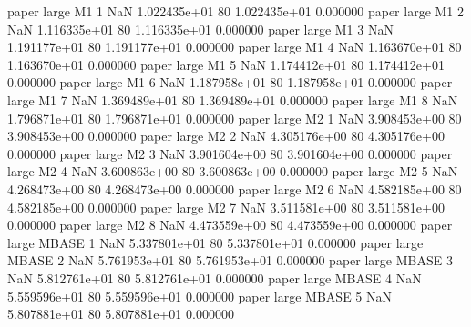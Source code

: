             paper      large       M1                 1                  NaN 1.022435e+01 80   1.022435e+01           0.000000
            paper      large       M1                 2                  NaN 1.116335e+01 80   1.116335e+01           0.000000
            paper      large       M1                 3                  NaN 1.191177e+01 80   1.191177e+01           0.000000
            paper      large       M1                 4                  NaN 1.163670e+01 80   1.163670e+01           0.000000
            paper      large       M1                 5                  NaN 1.174412e+01 80   1.174412e+01           0.000000
            paper      large       M1                 6                  NaN 1.187958e+01 80   1.187958e+01           0.000000
            paper      large       M1                 7                  NaN 1.369489e+01 80   1.369489e+01           0.000000
            paper      large       M1                 8                  NaN 1.796871e+01 80   1.796871e+01           0.000000
            paper      large       M2                 1                  NaN 3.908453e+00 80   3.908453e+00           0.000000
            paper      large       M2                 2                  NaN 4.305176e+00 80   4.305176e+00           0.000000
            paper      large       M2                 3                  NaN 3.901604e+00 80   3.901604e+00           0.000000
            paper      large       M2                 4                  NaN 3.600863e+00 80   3.600863e+00           0.000000
            paper      large       M2                 5                  NaN 4.268473e+00 80   4.268473e+00           0.000000
            paper      large       M2                 6                  NaN 4.582185e+00 80   4.582185e+00           0.000000
            paper      large       M2                 7                  NaN 3.511581e+00 80   3.511581e+00           0.000000
            paper      large       M2                 8                  NaN 4.473559e+00 80   4.473559e+00           0.000000
            paper      large    MBASE                 1                  NaN 5.337801e+01 80   5.337801e+01           0.000000
            paper      large    MBASE                 2                  NaN 5.761953e+01 80   5.761953e+01           0.000000
            paper      large    MBASE                 3                  NaN 5.812761e+01 80   5.812761e+01           0.000000
            paper      large    MBASE                 4                  NaN 5.559596e+01 80   5.559596e+01           0.000000
            paper      large    MBASE                 5                  NaN 5.807881e+01 80   5.807881e+01           0.000000
